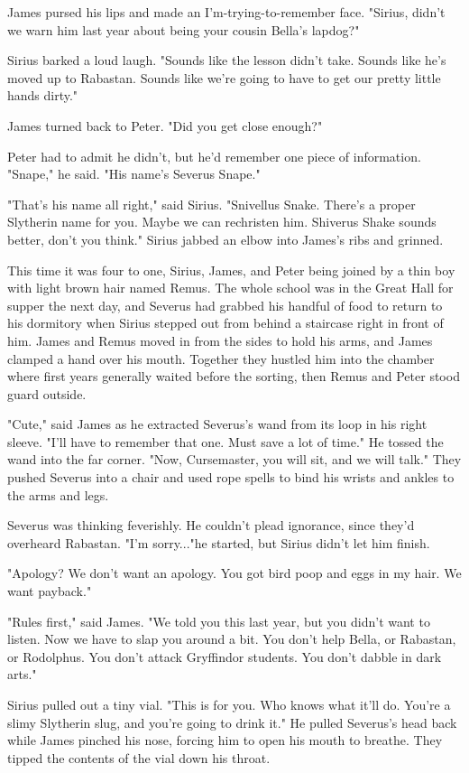 James pursed his lips and made an I'm-trying-to-remember face. "Sirius, didn't we warn him last year about being your cousin Bella's lapdog?"

Sirius barked a loud laugh. "Sounds like the lesson didn't take. Sounds like he's moved up to Rabastan. Sounds like we're going to have to get our pretty little hands dirty."

James turned back to Peter. "Did you get close enough?"

Peter had to admit he didn't, but he'd remember one piece of information. "Snape," he said. "His name's Severus Snape."

"That's his name all right," said Sirius. "Snivellus Snake. There's a proper Slytherin name for you. Maybe we can rechristen him. Shiverus Shake sounds better, don't you think." Sirius jabbed an elbow into James's ribs and grinned.

This time it was four to one, Sirius, James, and Peter being joined by a thin boy with light brown hair named Remus. The whole school was in the Great Hall for supper the next day, and Severus had grabbed his handful of food to return to his dormitory when Sirius stepped out from behind a staircase right in front of him. James and Remus moved in from the sides to hold his arms, and James clamped a hand over his mouth. Together they hustled him into the chamber where first years generally waited before the sorting, then Remus and Peter stood guard outside.

"Cute," said James as he extracted Severus's wand from its loop in his right sleeve. "I'll have to remember that one. Must save a lot of time." He tossed the wand into the far corner. "Now, Cursemaster, you will sit, and we will talk." They pushed Severus into a chair and used rope spells to bind his wrists and ankles to the arms and legs.

Severus was thinking feverishly. He couldn't plead ignorance, since they'd overheard Rabastan. "I'm sorry..."he started, but Sirius didn't let him finish.

"Apology? We don't want an apology. You got bird poop and eggs in my hair. We want payback."

"Rules first," said James. "We told you this last year, but you didn't want to listen. Now we have to slap you around a bit. You don't help Bella, or Rabastan, or Rodolphus. You don't attack Gryffindor students. You don't dabble in dark arts."

Sirius pulled out a tiny vial. "This is for you. Who knows what it'll do. You're a slimy Slytherin slug, and you're going to drink it." He pulled Severus's head back while James pinched his nose, forcing him to open his mouth to breathe. They tipped the contents of the vial down his throat.


